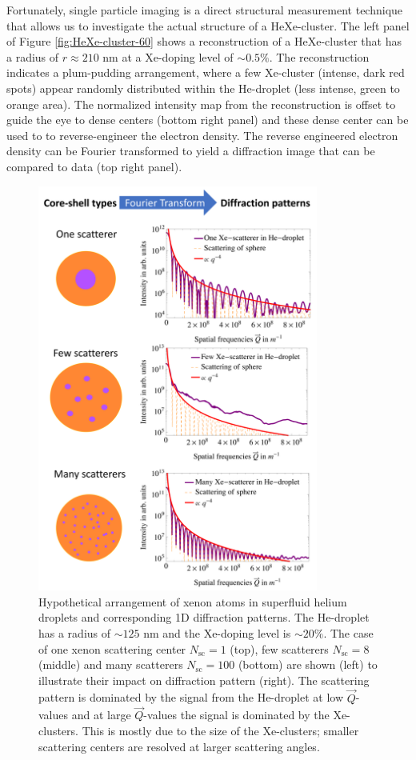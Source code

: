 Fortunately, single particle imaging is a direct structural measurement technique that allows us to investigate the actual structure of a HeXe-cluster. The left panel of Figure \ref{fig:HeXe-cluster-60} shows a reconstruction of a HeXe-cluster that has a radius of $r\approx 210$ nm at a Xe-doping level of $\sim 0.5 \%$. The reconstruction indicates a plum-pudding arrangement, where a few Xe-cluster (intense, dark red spots) appear randomly distributed within the He-droplet (less intense, green to orange area). The normalized intensity map from the reconstruction is offset to guide the eye to dense centers (bottom right panel) and these dense center can be used to to reverse-engineer the electron density. The reverse engineered electron density can be Fourier transformed to yield a diffraction image that can be compared to data (top right panel).
%
\begin{figure}
 	\centering
 		\includegraphics[width=0.82\textwidth]{images/results/plum-pudding.png}
 	\caption[Hypothetical arrangement of Xe-clusters within He-droplets.]{Hypothetical arrangement of xenon atoms in superfluid helium droplets and corresponding 1D diffraction patterns. The He-droplet has a radius of $\sim 125$ nm and the Xe-doping level is $\sim 20\%$. The case of one xenon scattering center $N_{\text{sc}}=1$ (top), few scatterers $N_{\text{sc}}=8$ (middle) and many scatterers $N_{\text{sc}}=100$ (bottom) are shown (left) to illustrate their impact on diffraction pattern (right). The scattering pattern is dominated by the signal from the He-droplet at low $\vec{Q}$-values and at large $\vec{Q}$-values the signal is dominated by the Xe-clusters. This is mostly due to the size of the Xe-clusters; smaller scattering centers are resolved at larger scattering angles.}
 	\label{fig:HeXe-plum-pudding}
\end{figure}
